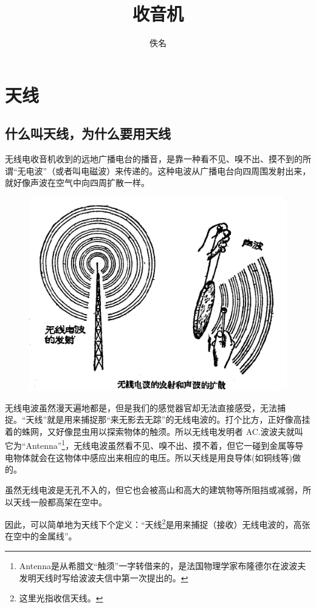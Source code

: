 \documentclass[12pt,UTF8]{ctexbook}
\title{\heiti\zihao{0} 收音机}
\author{佚名}
\date{}
\begin{document}
\maketitle
\tableofcontents

\frontmatter

\mainmatter

\chapter{天线}

\section{什么叫天线，为什么要用天线}

无线电收音机收到的远地广播电台的播音，是靠一种看不见、嗅不出、摸不到的所谓“无电波”（或者叫电磁波）来传递的。这种电波从广播电台向四周围发射出来，就好像声波在空气中向四周扩散一样。

\begin{figure}[htbp]
	\centering
	\includegraphics[width=0.7\linewidth]{1}
	\caption{}
	\label{fig:1}
\end{figure}

无线电波虽然漫天遍地都是，但是我们的感觉器官却无法直接感受，无法捕捉。“天线”就是用来捕捉那“来无影去无踪”的无线电波的。打个比方，正好像高挂着的蛛网，又好像昆虫用以探索物体的触须。所以无线电发明者 AC.波波夫就叫它为“Antenna”\footnote{Antenna是从希腊文“触须”一字转借来的，是法国物理学家布隆德尔在波波夫发明天线时写给波波夫信中第一次提出的。}，无线电波虽然看不见、嗅不出、摸不着，但它一碰到金属等导电物体就会在这物体中感应出来相应的电压。所以天线是用良导体(如铜线等)做的。

虽然无线电波是无孔不入的，但它也会被高山和高大的建筑物等所阻挡或减弱，所以天线一般都高架在空中。

因此，可以简单地为天线下个定义：“天线\footnote{这里光指收信天线。}是用来捕捉（接收）无线电波的，高张在空中的金属线”。
\end{document}
